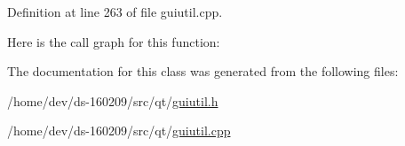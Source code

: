 Definition at line 263 of file guiutil.\+cpp.



Here is the call graph for this function\+:




The documentation for this class was generated from the following files\+:\begin{DoxyCompactItemize}
\item 
/home/dev/ds-\/160209/src/qt/\hyperlink{guiutil_8h}{guiutil.\+h}\item 
/home/dev/ds-\/160209/src/qt/\hyperlink{guiutil_8cpp}{guiutil.\+cpp}\end{DoxyCompactItemize}
